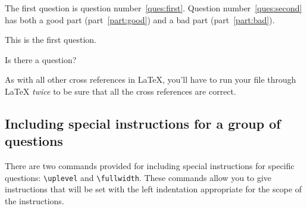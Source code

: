 \documentclass[12pt]{exam}
\begin{document}
\medskip

The first question is question number~\ref{ques:first}.
Question number~\ref{ques:second} has both a good part
(part~\ref{part:good}) and a bad part (part~\ref{part:bad}).

\begin{questions}
\question
\label{ques:first}
This is the first question.

\question
\label{ques:second}

\question
Is there a question?
\end{questions}



\bigskip

As with all other cross references in \LaTeX, you'll have to run your
file through \LaTeX{} \emph{twice} to be sure that all the cross
references are correct.


\subsection{Including special instructions for a group of questions}
\label{sec:uplevel}

There are two commands provided for including special instructions
for specific questions: \verb"\uplevel" and \verb"\fullwidth".  These
commands allow you to give instructions that will be set with the
left indentation appropriate for the scope of the instructions.
\end{document}
